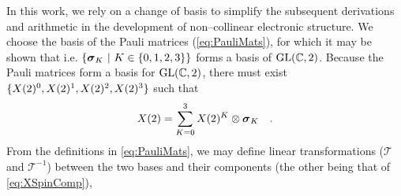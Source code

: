In this work, we rely on a change of basis to simplify the subsequent derivations and arithmetic in the development
of non--collinear electronic structure. We choose the basis of the Pauli matrices (\cref{eq:PauliMats}), for which it may
be shown that 
i.e. $\left\lbrace \pauli{K} \text{ }\vert\text{ } K \in \{0,1,2,3\} \right\rbrace$ forms a basis of  $\GL{C}{2}$.
Because the Pauli matrices form a basis for $\GL{C}{2}$, there must exist $\{ \spinor{2}{X}^0, \spinor{2}{X}^1, \spinor{2}{X}^2, \spinor{2}{X}^3 \}$
such that
\begin{equation}
\label{eq:XPauliBasis}
\spinor{2}{X} = \sum_{K = 0 }^3 \spinor{2}{X}^K \otimes \pauli{K} \quad.
\end{equation}
From the definitions in \cref{eq:PauliMats}, we may define linear transformations ($\mathscr{T}$ and $\mathscr{T}^{-1}$) between the two bases and their
components (the other being that of \cref{eq:XSpinComp}),

